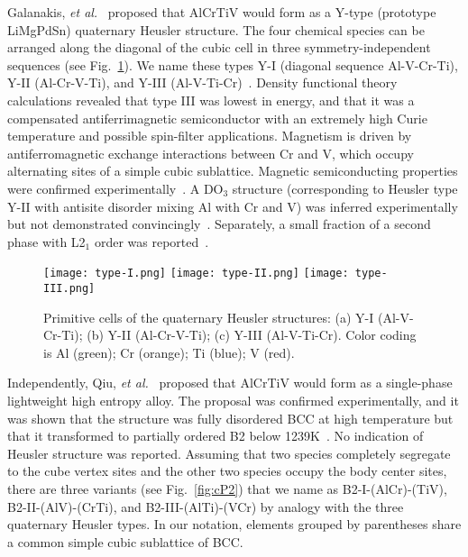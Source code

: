 \documentclass[twoside,12pt]{article}
\begin{document}
Galanakis, {\em et al.}~\cite{Galanakis_2014} proposed that AlCrTiV would form as a Y-type (prototype LiMgPdSn) quaternary Heusler structure. The four chemical species can be arranged along the diagonal of the cubic cell in three symmetry-independent sequences (see Fig.~\ref{fig:cF16}). We name these types Y-I (diagonal sequence Al-V-Cr-Ti), Y-II (Al-Cr-V-Ti), and Y-III (Al-V-Ti-Cr)~\cite{Widom_2024}. Density functional theory calculations revealed that type III was lowest in energy, and that it was a compensated antiferrimagnetic semiconductor with an extremely high Curie temperature and possible spin-filter applications. Magnetism is driven by antiferromagnetic exchange interactions between Cr and V, which occupy alternating sites of a simple cubic sublattice. Magnetic semiconducting properties were confirmed experimentally~\cite{Stephen2019JAP,Stephen2019PRB}. A DO$_3$ structure (corresponding to Heusler type Y-II with antisite disorder mixing Al with Cr and V) was inferred experimentally but not demonstrated convincingly~\cite{Venkat2018}. Separately, a small fraction of a second phase with L2$_1$ order was reported~\cite{Stephen2019JAP}.

\begin{figure}[h!]
  \texttt{[image: type-I.png]}
  \texttt{[image: type-II.png]}
  \texttt{[image: type-III.png]}
  \caption{\label{fig:cF16} Primitive cells of the quaternary Heusler structures: (a) Y-I (Al-V-Cr-Ti); (b) Y-II (Al-Cr-V-Ti); (c) Y-III (Al-V-Ti-Cr). Color coding is Al (green); Cr (orange); Ti (blue); V (red).}
\end{figure}

Independently, Qiu, {\em et al.}~\cite{Qiu2017} proposed that AlCrTiV would form as a single-phase lightweight high entropy alloy. The proposal was confirmed experimentally, and it was shown that the structure was fully disordered BCC at high temperature but that it transformed to partially ordered B2 below 1239K~\cite{Huang2022a}. No indication of Heusler structure was reported. Assuming that two species completely segregate to the cube vertex sites and the other two species occupy the body center sites, there are three variants (see Fig.~\ref{fig:cP2}) that we name as B2-I-(AlCr)-(TiV), B2-II-(AlV)-(CrTi), and B2-III-(AlTi)-(VCr) by analogy with the three quaternary Heusler types. In our notation, elements grouped by parentheses share a common simple cubic sublattice of BCC.
\end{document}
